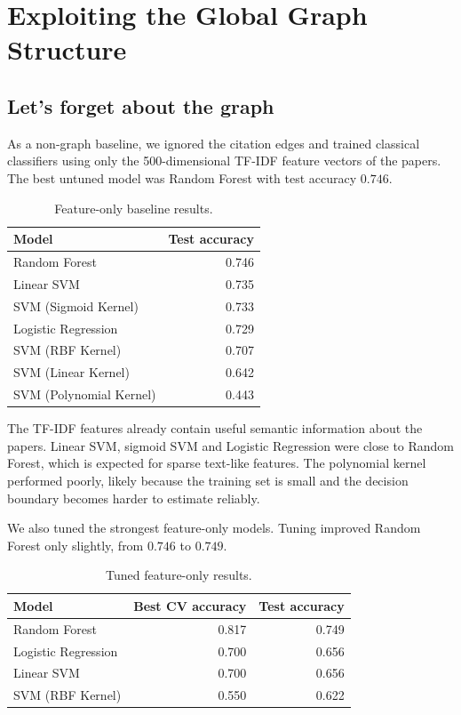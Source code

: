 \documentclass[11pt]{article}
\begin{document}
\section{Exploiting the Global Graph Structure}

\subsection{Let's forget about the graph}

As a non-graph baseline, we ignored the citation edges and trained classical classifiers using only the 500-dimensional TF-IDF feature vectors of the papers. The best untuned model was Random Forest with test accuracy $0.746$.

\begin{table}[H]
\centering
\caption{Feature-only baseline results.}
\begin{tabular}{lr}
\toprule
Model & Test accuracy \\
\midrule
Random Forest & 0.746 \\
Linear SVM & 0.735 \\
SVM (Sigmoid Kernel) & 0.733 \\
Logistic Regression & 0.729 \\
SVM (RBF Kernel) & 0.707 \\
SVM (Linear Kernel) & 0.642 \\
SVM (Polynomial Kernel) & 0.443 \\
\bottomrule
\end{tabular}
\end{table}

The TF-IDF features already contain useful semantic information about the papers. Linear SVM, sigmoid SVM and Logistic Regression were close to Random Forest, which is expected for sparse text-like features. The polynomial kernel performed poorly, likely because the training set is small and the decision boundary becomes harder to estimate reliably.

We also tuned the strongest feature-only models. Tuning improved Random Forest only slightly, from $0.746$ to $0.749$.

\begin{table}[H]
\centering
\caption{Tuned feature-only results.}
\begin{tabular}{lrr}
\toprule
Model & Best CV accuracy & Test accuracy \\
\midrule
Random Forest & 0.817 & 0.749 \\
Logistic Regression & 0.700 & 0.656 \\
Linear SVM & 0.700 & 0.656 \\
SVM (RBF Kernel) & 0.550 & 0.622 \\
\bottomrule
\end{tabular}
\end{table}
\end{document}
